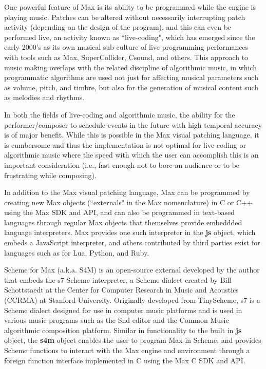 \documentclass[acmsmall]{acmart}
\begin{document}
One powerful feature of Max is its ability to be programmed
while the engine is playing music. Patches can be altered 
without necessarily interrupting patch activity (depending on the design
of the program), and this can
even be performed live, an activity known as ``live-coding", which has
emerged since the early 2000's as its own musical sub-culture of 
live programming performances
with tools such as Max, SuperCollider, Csound, and others. 
\cite{Roberts18}
This approach to music making overlaps with the related discipline of 
algorithmic music, in which programmatic algorithms are used
not just for affecting musical parameters such as volume, pitch, and timbre, 
but also for the generation of musical content such as melodies
and rhythms.

In both the fields of live-coding and algorithmic music, the ability for
the performer/composer to schedule events in the future with high temporal
accuracy is of major benefit. While this is possible in the Max visual
patching language, it is cumbersome and thus the implementation is not
optimal for live-coding or algorithmic music where the speed with which
the user can accomplish this is an important consideration (i.e., fast
enough not to bore an audience or to be frustrating while composing).

In addition to the Max visual patching language, Max can be programmed
by creating new Max objects (``externals" in the Max nomenclature) in C or C++ 
using the Max SDK and API, and can also be programmed in text-based 
languages through regular Max objects that themselves provide embeddded language
interpreters. Max provides one such interpreter in the \textbf{js} object, 
which embeds a JavaScript interpreter, and others contributed by third parties
exist for languages such as for Lua, Python, and Ruby. 

Scheme for Max (a.k.a. S4M) is an open-source external developed by the 
author that embeds the s7 Scheme interpreter, a Scheme dialect created by
Bill Schottstaedt at the  Center for Computer Research in Music and Acoustics
(CCRMA) at Stanford University. Originally developed
from TinyScheme, s7 is a Scheme dialect designed for use in computer music
platforms and is used in various music programs such as the Snd editor and the
Common Music algorithmic composition platform. 
\cite{Schottstaedt2021} 
Similar in functionality to the built
in \textbf{js} object, the \textbf{s4m} object enables the user to program Max in Scheme,
and provides Scheme functions to interact with the Max engine and environment through
a foreign function interface implemented in C using the Max C SDK and API.
\end{document}
